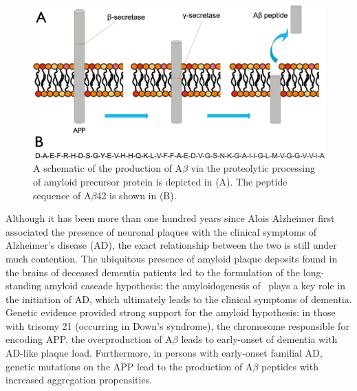 \begin{figure}
\centering
\includegraphics[width=6in]{figures/introduction/AD_abeta_app.pdf}
\caption[APP processing]{A schematic of the production of A$\beta$ via the proteolytic processing of amyloid precursor protein is depicted in (A). The peptide sequence of A$\beta$42 is shown in (B).}
\label{fig:AD_abeta_app}
\end{figure}

Although it has been more than one hundred years since Alois Alzheimer first associated the presence of neuronal plaques with the clinical symptoms of Alzheimer's disease (AD), the exact relationship between the two is still under much contention.  The ubiquitous presence of amyloid plaque deposits found in the brains of deceased dementia patients led to the formulation of the long-standing amyloid cascade hypothesis: the amyloidogenesis of \abeta\ plays a key role in the initiation of AD, which ultimately leads to the clinical symptoms of dementia.\cite{Hardy:2002dh} Genetic evidence provided strong support for the amyloid hypothesis: in those with trisomy 21 (occurring in Down's syndrome), the chromosome responsible for encoding APP,  the overproduction of A$\beta$ leads to early-onset of dementia with AD-like plaque load. Furthermore, in persons with early-onset familial AD, genetic mutations on the APP lead to the production of A$\beta$ peptides with increased aggregation propensities.\cite{Tam:2012vz}

